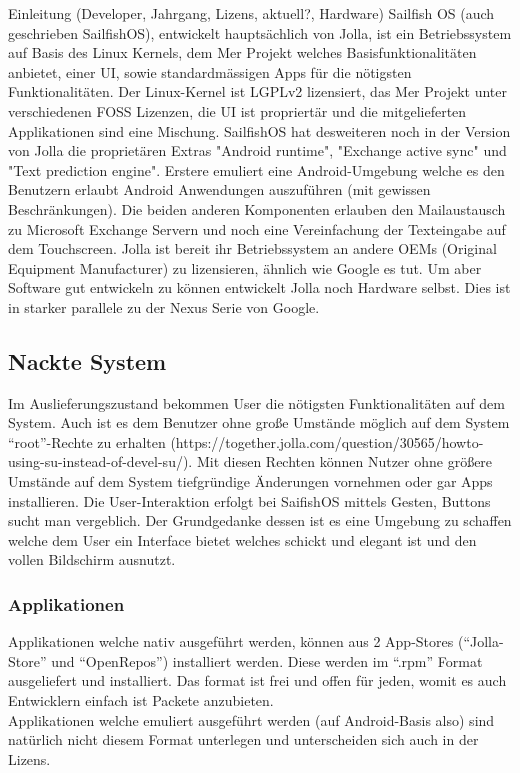 Einleitung (Developer, Jahrgang, Lizens, aktuell?, Hardware)
Sailfish OS (auch geschrieben SailfishOS), entwickelt hauptsächlich von Jolla, ist ein Betriebssystem auf Basis des Linux Kernels, dem Mer Projekt welches Basisfunktionalitäten anbietet, einer UI, sowie standardmässigen Apps für die nötigsten Funktionalitäten\cite{online:sailfish-about}. Der Linux-Kernel ist LGPLv2 lizensiert\cite{online:kernel-license}, das Mer Projekt unter verschiedenen FOSS Lizenzen\cite{online:mer-license}, die UI ist propriertär und die mitgelieferten Applikationen sind eine Mischung\cite{online:sailfish-about}\cite{online:sailfish-eula}. SailfishOS hat desweiteren noch in der Version von Jolla die proprietären Extras "Android runtime", "Exchange active sync" und "Text prediction engine". Erstere emuliert eine Android-Umgebung welche es den Benutzern erlaubt Android Anwendungen auszuführen (mit gewissen Beschränkungen\cite{online:sailfish-android}). Die beiden anderen Komponenten erlauben den Mailaustausch zu Microsoft Exchange Servern und noch eine Vereinfachung der Texteingabe auf dem Touchscreen. Jolla ist bereit ihr Betriebssystem an andere OEMs (Original Equipment Manufacturer) zu lizensieren, ähnlich wie Google es tut. Um aber Software gut entwickeln zu können entwickelt Jolla noch Hardware selbst. Dies ist in starker parallele zu der Nexus Serie von Google.\\

\subsection{Nackte System}
Im Auslieferungszustand bekommen User die nötigsten Funktionalitäten auf dem System. Auch ist es dem Benutzer ohne große Umstände möglich auf dem System ``root''-Rechte zu erhalten (https://together.jolla.com/question/30565/howto-using-su-instead-of-devel-su/). Mit diesen Rechten können Nutzer ohne größere Umstände auf dem System tiefgründige Änderungen vornehmen oder gar Apps installieren. Die User-Interaktion erfolgt bei SaifishOS mittels Gesten, Buttons sucht man vergeblich. Der Grundgedanke dessen ist es eine Umgebung zu schaffen welche dem User ein Interface bietet welches schickt und elegant ist und den vollen Bildschirm ausnutzt\cite{online:sailfish-ui}.
\subsubsection{Applikationen}
Applikationen welche nativ ausgeführt werden, können aus 2 App-Stores (``Jolla-Store'' und ``OpenRepos''\cite{online:openrepos}) installiert werden. Diese werden im ``{.}rpm'' Format ausgeliefert und installiert. Das format ist frei und offen\cite{online:rpm-license} für jeden, womit es auch Entwicklern einfach ist Packete anzubieten.\\
Applikationen welche emuliert ausgeführt werden (auf Android-Basis also) sind natürlich nicht diesem Format unterlegen und unterscheiden sich auch in der Lizens.\\

